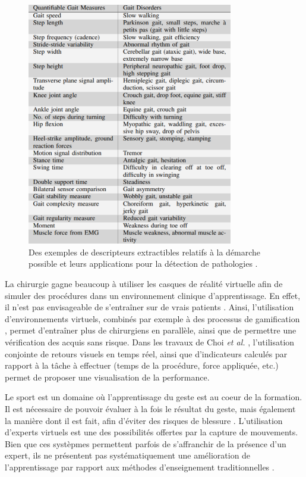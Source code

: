 \begin{figure}
    \centering
    \includegraphics[width=9cm]{pictures/gait_possibilities.png}
    \caption[Descripteurs pour l'analyse de la démarche \parencite{Chen2016TPG}]{Des exemples de descripteurs extractibles relatifs à la démarche possible et leurs applications pour la détection de pathologies \parencite{Chen2016TPG}.}
    \label{fig:gait_possibilities}
\end{figure}

La chirurgie gagne beaucoup à utiliser les casques de réalité virtuelle afin de simuler des procédures dans un environnement clinique d'apprentissage. En effet, il n'est pas envisageable de s'entraîner sur de vrais patients \parencite{Kneebone2004Sac}. Ainsi, l'utilisation d'environnements virtuels, combinés par exemple à des processus de gamification \parencite{Pulijala2017VRS}, permet d'entraîner plus de chirurgiens en parallèle, ainsi que de permettre une vérification des acquis sans risque. Dans les travaux de Choi \textit{et al.} \parencite{Choi2015103}, l'utilisation conjointe de retours visuels en temps réel, ainsi que d'indicateurs calculés par rapport à la tâche à effectuer (temps de la procédure, force appliquée, etc.) permet de proposer une visualisation de la performance.

Le sport est un domaine où l'apprentissage du geste est au coeur de la formation. Il est nécessaire de pouvoir évaluer à la fois le résultat du geste, mais également la manière dont il est fait, afin d'éviter des risques de blessure \parencite{Rawashdeh2016WIMU}. L'utilisation d'experts virtuels est une des possibilités offertes par la capture de mouvements. Bien que ces systèpmes permettent parfois de s'affranchir de la présence d'un expert, ils ne présentent pas systématiquement une amélioration de l'apprentissage par rapport aux méthodes d'enseignement traditionnelles \parencite{Philo2003Tfp}.

